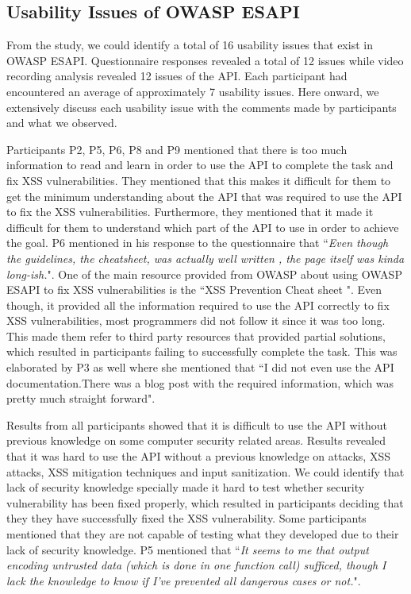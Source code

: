 \documentclass[10pt]{article}
\begin{document}
\subsection{Usability Issues of OWASP ESAPI}

From the study, we could identify a total of 16 usability issues that exist in OWASP ESAPI. Questionnaire responses revealed a total of 12 issues while video recording analysis revealed 12 issues of the API. Each participant had encountered an average of approximately 7 usability issues. Here onward, we extensively discuss each usability issue with the comments made by participants and what we observed.

Participants P2, P5, P6, P8 and P9 mentioned that there is too much information to read and learn in order to use the API to complete the task and fix XSS vulnerabilities. They mentioned that this makes it difficult for them to get the minimum understanding about the API that was required to use the API to fix the XSS vulnerabilities. Furthermore, they mentioned that it made it difficult for them to understand which part of the API to use in order to achieve the goal. P6 mentioned in his response to the questionnaire that ``\textit{Even though the guidelines, the cheatsheet, was actually well written , the page itself was kinda long-ish.}". One of the main resource provided from OWASP about using OWASP ESAPI to fix XSS vulnerabilities is the ``XSS Prevention Cheat sheet \cite{owasp10cheat}". Even though, it provided all the information required to use the API correctly to fix XSS vulnerabilities, most programmers did not follow it since it was too long. This made them refer to third party resources that provided partial solutions, which resulted in participants failing to successfully complete the task. This was elaborated by P3 as well where she mentioned that ``I did not even use the API documentation.There was a blog post with the required information, which was pretty much straight forward".

Results from all participants showed that it is difficult to use the API without previous knowledge on some computer security related areas. Results revealed that it was hard to use the API without a previous knowledge on attacks, XSS attacks, XSS mitigation techniques and input sanitization. We could identify that lack of security knowledge specially made it hard to test whether security vulnerability has been fixed properly, which resulted in participants deciding that they they have successfully fixed the XSS vulnerability. Some participants mentioned that they are not capable of testing what they developed due to their lack of security knowledge. P5 mentioned that ``\textit{It seems to me that output encoding untrusted data (which is done in one function call) sufficed, though I lack the knowledge to know if I've prevented all dangerous cases or not.}".
\end{document}

